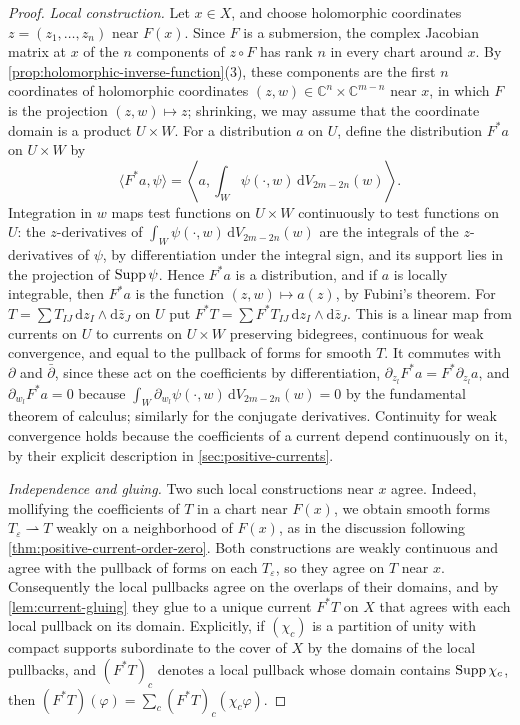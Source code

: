 \begin{proof}
\emph{Local construction.} Let $x\in X$, and choose holomorphic coordinates $z=(z_1,\ldots,z_n)$ near $F(x)$. Since $F$ is a submersion, the complex Jacobian matrix at $x$ of the $n$ components of $z\circ F$ has rank $n$ in every chart around $x$. By \cref{prop:holomorphic-inverse-function}(3), these components are the first $n$ coordinates of holomorphic coordinates $(z,w)\in\mathbb C^n\times\mathbb C^{m-n}$ near $x$, in which $F$ is the projection $(z,w)\mapsto z$; shrinking, we may assume that the coordinate domain is a product $U\times W$. For a distribution $a$ on $U$, define the distribution $F^*a$ on $U\times W$ by
\[
 \langle F^*a,\psi\rangle
 =\left\langle a,\int_{W}\psi(\cdot,w)\,\mathrm{d}V_{2m-2n}(w)\right\rangle.
\]
Integration in $w$ maps test functions on $U\times W$ continuously to test functions on $U$: the $z$-derivatives of $\int_W\psi(\cdot,w)\,\mathrm dV_{2m-2n}(w)$ are the integrals of the $z$-derivatives of $\psi$, by differentiation under the integral sign, and its support lies in the projection of $\operatorname{Supp}\psi$. Hence $F^*a$ is a distribution, and if $a$ is locally integrable, then $F^*a$ is the function $(z,w)\mapsto a(z)$, by Fubini's theorem. For $T=\sum T_{IJ}\,\mathrm dz_I\wedge\mathrm d\bar z_J$ on $U$ put $F^*T=\sum F^*T_{IJ}\,\mathrm dz_I\wedge\mathrm d\bar z_J$. This is a linear map from currents on $U$ to currents on $U\times W$ preserving bidegrees, continuous for weak convergence, and equal to the pullback of forms for smooth $T$. It commutes with $\partial$ and $\bar\partial$, since these act on the coefficients by differentiation, $\partial_{z_l}F^*a=F^*\partial_{z_l}a$, and $\partial_{w_l}F^*a=0$ because $\int_W\partial_{w_l}\psi(\cdot,w)\,\mathrm dV_{2m-2n}(w)=0$ by the fundamental theorem of calculus; similarly for the conjugate derivatives. Continuity for weak convergence holds because the coefficients of a current depend continuously on it, by their explicit description in \cref{sec:positive-currents}.

\emph{Independence and gluing.} Two such local constructions near $x$ agree. Indeed, mollifying the coefficients of $T$ in a chart near $F(x)$, we obtain smooth forms $T_\varepsilon\rightharpoonup T$ weakly on a neighborhood of $F(x)$, as in the discussion following \cref{thm:positive-current-order-zero}. Both constructions are weakly continuous and agree with the pullback of forms on each $T_\varepsilon$, so they agree on $T$ near $x$. Consequently the local pullbacks agree on the overlaps of their domains, and by \cref{lem:current-gluing} they glue to a unique current $F^*T$ on $X$ that agrees with each local pullback on its domain. Explicitly, if $(\chi_c)$ is a partition of unity with compact supports subordinate to the cover of $X$ by the domains of the local pullbacks, and $(F^*T)_c$ denotes a local pullback whose domain contains $\operatorname{Supp}\chi_c$, then $(F^*T)(\varphi)=\sum_c(F^*T)_c(\chi_c\varphi)$.


\end{proof}

